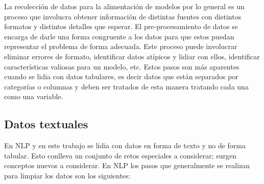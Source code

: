 La recolección de datos para la alimentación de modelos por lo general es un proceso que involucra obtener información de distintas fuentes con distintos formatos y distintos detalles que esperar. El pre-procesamiento de datos se encarga de darle una forma congruente a los datos para que estos puedan representar el problema de forma adecuada. Este proceso puede involucrar eliminar errores de formato, identificar datos atípicos y lidiar con ellos, identificar características valiosas para un modelo, etc. Estos pasos son más aparentes cuando se lidia con datos tabulares, es decir datos que están separados por categorías o columnas y deben ser tratados de esta manera tratando cada una como una variable.

\subsection{Datos textuales}

En NLP y en este trabajo se lidia con datos en forma de texto y no de forma tabular. Esto conlleva un conjunto de retos especiales a considerar; surgen conceptos nuevos a considerar. En NLP los pasos que generalmente se realizan para limpiar los datos son los siguientes:

